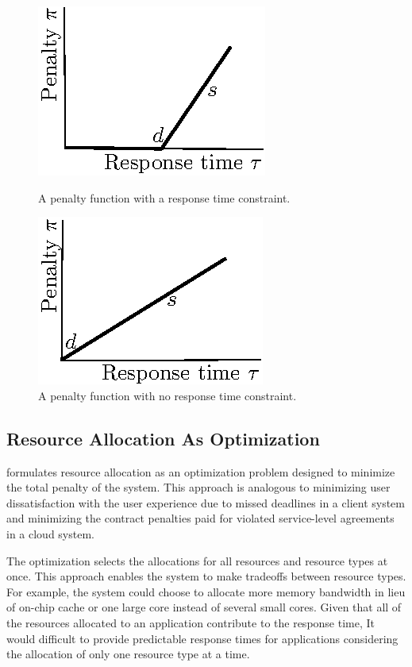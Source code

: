 \begin{figure}[hb]
\parbox{1.6in}{
\includegraphics*{Penalty1.eps}
\caption{\label{f:pen1}A penalty function with a response time constraint.}
}
\hspace{\fill}
\parbox{1.6in}{
\includegraphics*{Penalty2.eps}
\caption{\label{f:pen2}A penalty function with no response time constraint.}
}
\end{figure}

\subsection*{Resource Allocation As Optimization}
\pacora formulates resource allocation as an optimization problem designed to minimize the total penalty of the system. This approach is analogous to minimizing user dissatisfaction with the user experience due to missed deadlines in a client system and minimizing the contract penalties paid for violated service-level agreements in a cloud system.

The optimization selects the allocations for all resources and resource types at once.  This approach enables the system to make tradeoffs between resource types.  For example, the system could choose to allocate more memory bandwidth in lieu of on-chip cache or one large core instead of several small cores.  Given that all of the resources allocated to an application contribute to the response time, It would difficult to provide predictable response times for applications considering the allocation of only one resource type at a time.

